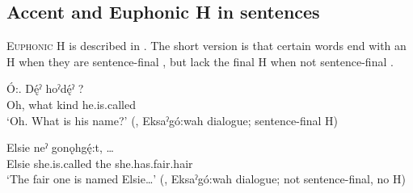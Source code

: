 \subsection{Accent and Euphonic H in sentences} \label{Accent and pronunciation H in sentences}
\textsc{Euphonic H} is described in . The short version is that certain words end with an H when they are sentence-final , but lack the final H when not sentence-final .

\ea\label{ex:accexs3} 
\gll Ó:. Dę́ˀ hoˀdę́ˀ ? \\
Oh, what kind he.is.called\\
\glt ‘Oh. What is his name?’ (\cite[88]{mithun_watewayestanih_1984}, Eksaˀgó:wah dialogue; sentence-final H)
\z


\ea\label{ex:accexs} 
 \gll Elsie   neˀ gonǫhgę́:t, … \\
Elsie she.is.called the she.has.fair.hair\\
\glt ‘The fair one is named Elsie…’ (\cite[88]{mithun_watewayestanih_1984}, Eksaˀgó:wah dialogue; not sentence-final, no H)
\z
